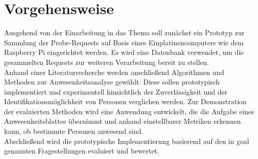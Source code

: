 \section{Vorgehensweise}\label{approach}

Ausgehend von der Einarbeitung in das Thema soll zunächst ein Prototyp zur Sammlung der Probe-Requests auf Basis eines Einplatinencomputers wie dem Raspberry Pi eingerichtet werden.
Es wird eine Datenbank verwendet, um die gesammelten Requests zur weiteren Verarbeitung bereit zu stellen.
\\

Anhand einer Literaturrecherche werden anschließend Algorithmen und Methoden zur Anwesenheitsanalyse gewählt.
Diese sollen prototypisch implementiert und experimentell hinsichtlich der Zuverlässigkeit und der Identifikationsmöglichkeit von Personen verglichen werden.
Zur Demonstration der evaluierten Methoden wird eine Anwendung entwickelt, die die Aufgabe eines Anwesenheitsblattes übernimmt und anhand einstellbarer Metriken erkennen kann, ob bestimmte Personen anwesend sind.
\\

Abschließend wird die prototypische Implementierung basierend auf den in \refname{goal} genannten Fragestellungen evaluiert und bewertet.